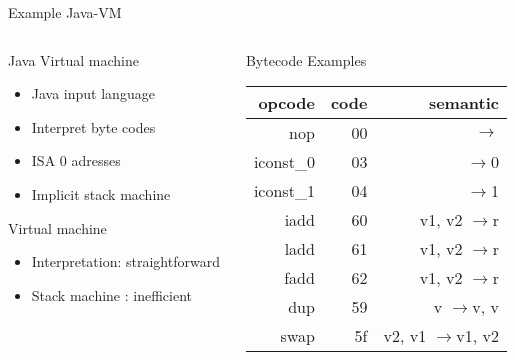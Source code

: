 %
\begin{Frame}{Example Java-VM}
  \begin{columns}[t]
    \begin{column}{5cm} %
      \begin{block}{Java Virtual machine}
        \begin{itemize}
        \item Java input language
        \item Interpret byte codes
        \item ISA 0 adresses
        \item Implicit stack machine
        \end{itemize}
      \end{block} 
      \begin{block}{Virtual machine}
        \begin{itemize}
        \item Interpretation: straightforward
        \item Stack machine : inefficient
        \end{itemize}
      \end{block} 
    \end{column}
\newcommand{\RA}{$\rightarrow$}
    \begin{column}{5cm} %
      \begin{block}{Bytecode Examples}
\footnotesize       \begin{tabular}{|r r r|}\hline{}
opcode       & code & semantic \\ \hline
nop 	     & 00 &	\RA\\
iconst\_0    & 03 &	\RA 0 \\
iconst\_1    & 04 &	\RA 1 \\
iadd 	     & 60 &	v1, v2 \RA r\\ 
ladd 	     & 61 &	v1, v2 \RA r \\
fadd 	     & 62 &	v1, v2 \RA r \\
dup  	     & 59 &	v \RA v, v \\
swap 	     & 5f & v2, v1 \RA v1, v2\\
\hline
        \end{tabular}
      \end{block}   
    \end{column}
  \end{columns}  
\end{Frame}


